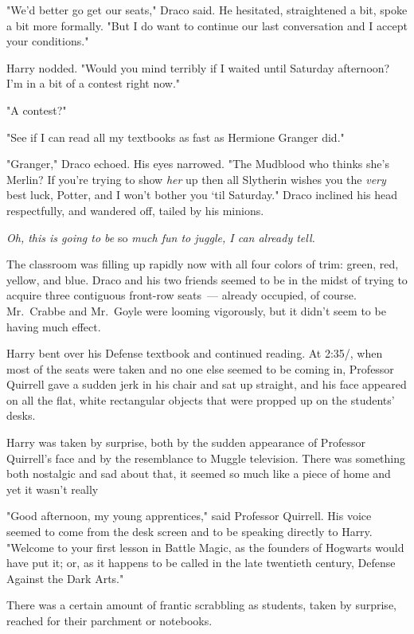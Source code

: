 "We'd better go get our seats," Draco said. He hesitated, straightened a bit,
spoke a bit more formally. "But I do want to continue our last conversation and
I accept your conditions."

Harry nodded. "Would you mind terribly if I waited until Saturday afternoon?
I'm in a bit of a contest right now."

"A contest?"

"See if I can read all my textbooks as fast as Hermione Granger did."

"Granger," Draco echoed. His eyes narrowed. "The Mudblood who thinks she's
Merlin? If you're trying to show \emph{her} up then all Slytherin wishes you
the \emph{very} best luck, Potter, and I won't bother you `til Saturday." Draco
inclined his head respectfully, and wandered off, tailed by his minions.

\emph{Oh, this is going to be} so \emph{much fun to juggle, I can already tell.}

The classroom was filling up rapidly now with all four colors of trim: green,
red, yellow, and blue. Draco and his two friends seemed to be in the midst of
trying to acquire three contiguous front-row seats~--- already occupied, of
course. Mr.~Crabbe and Mr.~Goyle were looming vigorously, but it didn't seem to
be having much effect.

Harry bent over his Defense textbook and continued reading.
\sbreak
At 2:35\PM/, when most of the seats were taken and no one else seemed to be
coming in, Professor Quirrell gave a sudden jerk in his chair and sat up
straight, and his face appeared on all the flat, white rectangular objects that
were propped up on the students' desks.

Harry was taken by surprise, both by the sudden appearance of Professor
Quirrell's face and by the resemblance to Muggle television. There was
something both nostalgic and sad about that, it seemed so much like a piece of
home and yet it wasn't really{\el}

"Good afternoon, my young apprentices," said Professor Quirrell. His voice
seemed to come from the desk screen and to be speaking directly to Harry.
"Welcome to your first lesson in Battle Magic, as the founders of Hogwarts
would have put it; or, as it happens to be called in the late twentieth
century, Defense Against the Dark Arts."

There was a certain amount of frantic scrabbling as students, taken by
surprise, reached for their parchment or notebooks.


